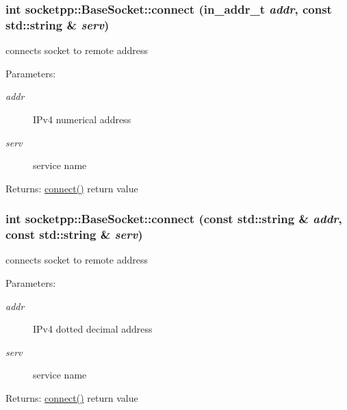 \begin{CompactItemize}
{\subsubsection[{connect}]{\setlength{\rightskip}{0pt plus 5cm}int socketpp::BaseSocket::connect (in\_\-addr\_\-t {\em addr}, \/  const std::string \& {\em serv})}}
\label{classsocketpp_1_1BaseSocket_7603795bfbcf43a4167fedc8fe8fe5b3}


connects socket to remote address 

\begin{Desc}
\item[Parameters:]
\begin{description}
\item[{\em addr}]IPv4 numerical address \item[{\em serv}]service name \end{description}
\end{Desc}
\begin{Desc}
\item[Returns:]\hyperlink{classsocketpp_1_1BaseSocket_769710192256606aaec1a776468d75fa}{connect()} return value \end{Desc}
\hypertarget{classsocketpp_1_1BaseSocket_ec01996bf257fdf9d71c1c3eb6bb6519}{
\subsubsection[{connect}]{\setlength{\rightskip}{0pt plus 5cm}int socketpp::BaseSocket::connect (const std::string \& {\em addr}, \/  const std::string \& {\em serv})}}
\label{classsocketpp_1_1BaseSocket_ec01996bf257fdf9d71c1c3eb6bb6519}


connects socket to remote address 

\begin{Desc}
\item[Parameters:]
\begin{description}
\item[{\em addr}]IPv4 dotted decimal address \item[{\em serv}]service name \end{description}
\end{Desc}
\begin{Desc}
\item[Returns:]\hyperlink{classsocketpp_1_1BaseSocket_769710192256606aaec1a776468d75fa}{connect()} return value \end{Desc}
\hypertarget{classsocketpp_1_1BaseSocket_2bdd6d459e6f9cf2f71636b01787b250}{
}
\end{CompactItemize}
